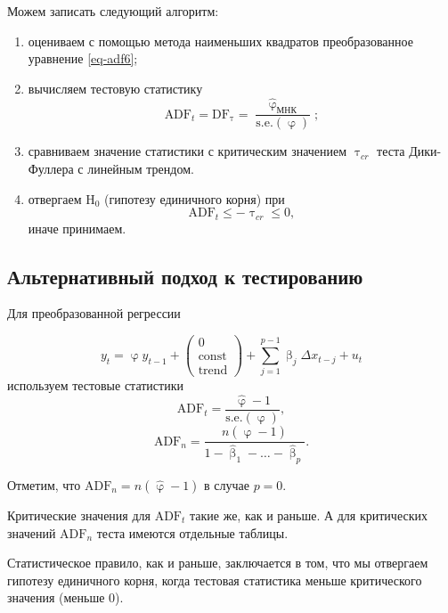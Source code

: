 \documentclass[a4paper, 14pt]{extreport}
\numberwithin{equation}{subsection}
\renewcommand{\leq}{\leqslant}
\renewcommand{\beta}{\upbeta}
\renewcommand{\varphi}{\upvarphi}
\renewcommand{\tau}{\uptau}
\numberwithin{equation}{section}
\begin{document}
	Можем записать следующий алгоритм:
	\begin{enumerate}
		\renewcommand{\labelenumi}{(\alph{enumi})}
		\item оцениваем с помощью метода наименьших квадратов преобразованное уравнение \eqref{eq-adf6};
		\item вычисляем тестовую статистику
		\begin{equation}
			\text{ADF}_t=\text{DF}_\tau=\dfrac{\widehat{\varphi}_{\text{МНК}}}{\text{s.e.}(\varphi)};
		\end{equation}
		\item сравниваем значение статистики с критическим значением $\tau_{cr}$ теста Дики-Фуллера с линейным трендом.
		\item отвергаем $\text{H}_0$ (гипотезу единичного корня) при
		\begin{equation}\text{ADF}_t\leq-\tau_{cr}\leq 0,\end{equation}
		иначе принимаем.
	\end{enumerate}
	
	\subsection{Альтернативный подход к тестированию}
	Для преобразованной регрессии
	
	\begin{equation}
		y_t=\varphi y_{t-1}+\begin{pmatrix}0\\\text{const}\\\text{trend}\end{pmatrix}+\sum\limits_{j=1}^{p-1}\beta_j\Delta x_{t-j}+u_t
	\end{equation}
	используем тестовые статистики
	\begin{equation}
		\text{ADF}_t=\dfrac{\widehat{\varphi}-1}{\text{s.e.}(\varphi)},
	\end{equation}
	\begin{equation}
		\text{ADF}_n=\dfrac{n(\widehat{\varphi}-1)}{1-\widehat{\beta}_1-\dots-\widehat{\beta}_p}.
	\end{equation}
	
	Отметим, что $\text{ADF}_n=n(\widehat{\varphi}-1)$ в случае $p=0$.
	
	Критические значения для $\text{ADF}_t$ такие же, как и раньше. А для критических значений $\text{ADF}_n$ теста имеются отдельные таблицы.
	
	Статистическое правило, как и раньше, заключается в том, что мы отвергаем гипотезу единичного корня, когда тестовая статистика меньше критического значения (меньше 0).
\end{document}
